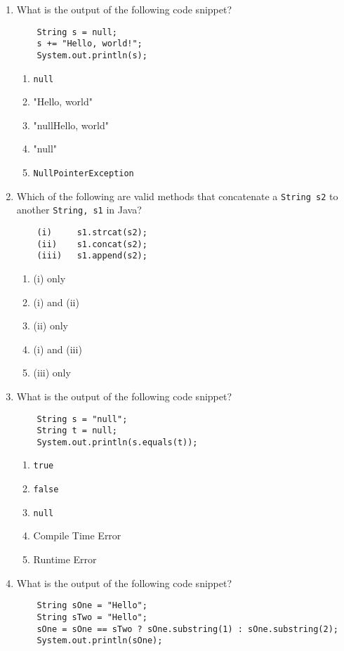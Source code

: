\documentclass[S17-Final.tex]{subfiles}
\begin{document}
\begin{enumerate}
\item What is the output of the following code snippet?
\begin{lstlisting}
    String s = null;
    s += "Hello, world!";
    System.out.println(s);  
\end{lstlisting}

\begin{enumerate}
\item  \texttt{null}
\item  "Hello, world"
\item "nullHello, world"
\item "null"
\item \texttt{NullPointerException}
\end{enumerate}

\item Which of the following are valid methods that concatenate a \texttt{String s2} to another \texttt{String, s1} in Java?
\begin{lstlisting}
    (i)     s1.strcat(s2);
    (ii)    s1.concat(s2);
    (iii)   s1.append(s2);
\end{lstlisting}

\begin{enumerate}
\item  (i) only
\item  (i) and (ii)
\item  (ii) only
\item  (i) and (iii)
\item  (iii) only
\end{enumerate}

\item What is the output of the following code snippet?
\begin{lstlisting}
    String s = "null";
    String t = null;
    System.out.println(s.equals(t));
\end{lstlisting}

\begin{enumerate}
\item \texttt{true}
\item \texttt{false}
\item \texttt{null}
\item Compile Time Error
\item Runtime Error
\end{enumerate}

\clearpage

\item What is the output of the following code snippet?
\begin{lstlisting}
    String sOne = "Hello";
    String sTwo = "Hello";
    sOne = sOne == sTwo ? sOne.substring(1) : sOne.substring(2);
    System.out.println(sOne);
\end{lstlisting}


\end{enumerate}
\end{document}
